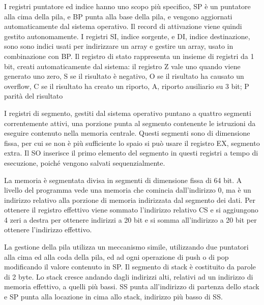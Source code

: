 \documentclass{article}
\numberwithin{equation}{subsection}
\begin{document}
I registri puntatore ed indice hanno uno scopo più specifico, SP è un puntatore alla cima della pila, e BP punta alla base della pila, e vengono aggiornati automaticamente 
dal sistema operativo. Il record di attivazione viene quindi gestito autonomamente. 
I registri SI, indice sorgente, e DI, indice destinazione, sono sono indici usati per indirizzare un array e gestire un array, usato in combinazione con BP. 
Il registro di stato rappresenta un insieme di registri da 1 bit, creati automaticamente dal sistema: il registro Z vale uno quando viene generato uno zero, S se il risultato è 
negativo, O se il risultato ha causato un overflow, C se il risultato ha creato un riporto, A, riporto ausiliario su 3 bit; P parità del risultato %

I registri di segmento, gestiti dal sistema operativo puntano a quattro segmenti correntemente attivi, una porzione punta al segmento contenente le istruzioni da eseguire 
contenuto nella memoria centrale. Questi segmenti sono di dimensione fissa, per cui se non è più sufficiente lo spaio si può usare il registro EX, segmento extra. 
Il SO inserisce il primo elemento del segmento in questi registri a tempo di esecuzione, poiché vengono salvati sequenzialmente. 

La memoria è segmentata divisa in segmenti di dimensione fissa di 64 bit. A livello del programma vede una memoria che comincia dall'indirizzo 0, ma è un indirizzo relativo 
alla porzione di memoria indirizzata dal segmento dei dati. Per ottenere il registro effettivo viene sommato l'indirizzo relativo CS e si aggiungono 4 zeri a destra per ottenere 
indirizzi a 20 bit e si somma all'indirizzo a 20 bit per ottenere l'indirizzo effettivo. 

La gestione della pila utilizza un meccanismo simile, utilizzando due puntatori alla cima ed alla coda della pila, ed ad ogni operazione di push o di pop modificando il valore 
contenuto in SP. Il segmento di stack è costituito da parole di 2 byte. Lo stack cresce andando dagli indirizzi alti, relativi ad un indirizzo di memoria effettivo, a quelli più 
bassi. SS punta all'indirizzo di partenza dello stack e SP punta alla locazione in cima allo stack, indirizzo più basso di SS. 
\end{document}
